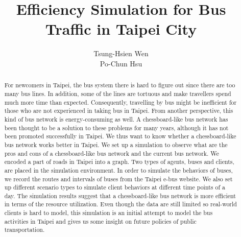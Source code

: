 \documentclass{sig-alternate}
\title{Efficiency Simulation for Bus Traffic in Taipei City}
\author{
 \alignauthor
 Tsung-Hsien Wen\\
 	\email{r00921033@ntu.edu.tw}
 \alignauthor
 Po-Chun Hsu\\
 	\email{r00921034@ntu.edu.tw}
 }
\begin{document}
\maketitle

\begin{abstract}
For newcomers in Taipei, the bus system there is hard to figure out since there are too many bus lines.
In addition, some of the lines are tortuous and make travellers spend much more time than expected.
Consequently, travelling by bus might be inefficient for those who are not experienced in taking bus in Taipei.
From another perspective, this kind of bus network is energy-consuming as well.
A chessboard-like bus network has been thought to be a solution to these problems for many years, although it has not been promoted successfully in Taipei.
We thus want to know whether a chessboard-like bus network works better in Taipei.
We set up a simulation to observe what are the pros and cons of a chessboard-like bus network and the current bus network.
We encoded a part of roads in Taipei into a graph.
Two types of agents, buses and clients, are placed in the simulation environment.
In order to simulate the behaviors of buses, we record the routes and intervals of buses from the Taipei e-bus website.
We also set up different scenario types to simulate client behaviors at different time points of a day.
The simulation results suggest that a chessboard-like bus network is more efficient in terms of the resource utilization.
Even though the data are still limited so real-world clients is hard to model, this simulation is an initial attempt to model the bus activities in Taipei and gives us some insight on future policies of public transportation.
\end{abstract}
\end{document}

